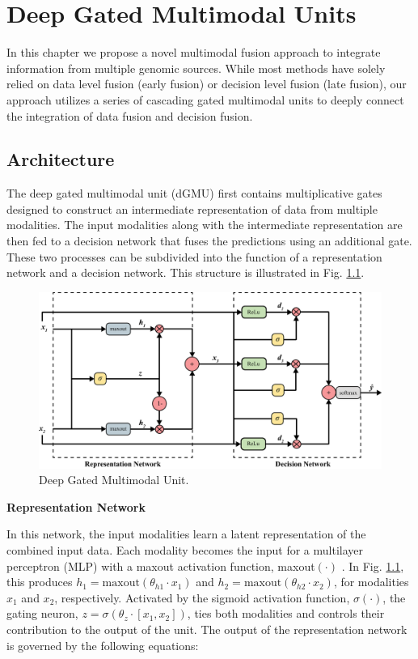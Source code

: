 \chapter{Deep Gated Multimodal Units} \label{chap:deepgmu}

In this chapter we propose a novel multimodal fusion approach to integrate information from multiple genomic sources. While most methods have solely relied on data level fusion (early fusion) or decision level fusion (late fusion), our approach utilizes a series of cascading gated multimodal units to deeply connect the integration of data fusion and decision fusion.

\section{Architecture}

The deep gated multimodal unit (dGMU) first contains multiplicative gates designed to construct an intermediate representation of data from multiple modalities. The input modalities along with the intermediate representation are then fed to a decision network that fuses the predictions using an additional gate. These two processes can be subdivided into the function of a representation network and a decision network. This structure is illustrated in Fig. \ref{fig:dgmu}. 

\begin{figure}[h!]
    \centering
    \includegraphics[width=\textwidth]{img/dGMU.eps}
    \caption{Deep Gated Multimodal Unit.}
    \label{fig:dgmu}
\end{figure}

\noindent
\textbf{Representation Network}

In this network, the input modalities learn a latent representation of the combined input data. Each modality becomes the input for a multilayer perceptron (MLP) with a maxout activation function, maxout$(\cdot)$ \cite{goodfellow2013maxout}. In Fig. \ref{fig:dgmu}, this produces $h_1 = \mathrm{maxout}(\theta_{h1} \cdot x_1)$ and $h_2 = \mathrm{maxout}(\theta_{h2} \cdot x_2)$, for modalities $x_1$ and $x_2$, respectively. Activated by the sigmoid activation function, $\sigma(\cdot)$, the gating neuron, $z = \sigma(\theta_z \cdot [x_1,x_2])$, ties both modalities and controls their contribution to the output of the unit. The output of the representation network is governed by the following equations:


